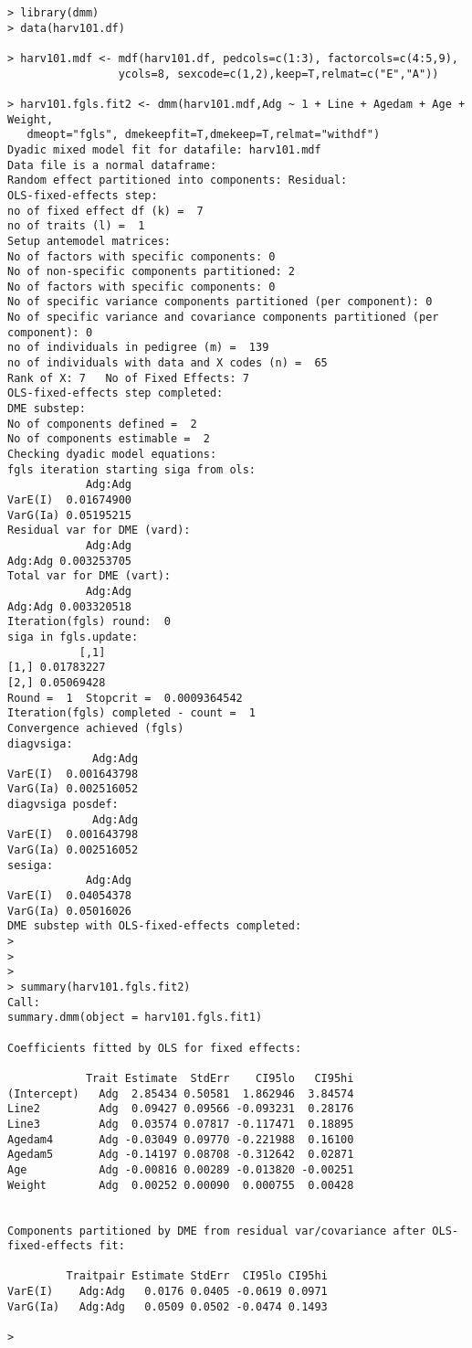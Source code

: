 \documentclass[titlepage,a4paper,12pt]{article}  %
\begin{document}
\begin{verbatim}
> library(dmm)
> data(harv101.df)

> harv101.mdf <- mdf(harv101.df, pedcols=c(1:3), factorcols=c(4:5,9),
                 ycols=8, sexcode=c(1,2),keep=T,relmat=c("E","A"))

> harv101.fgls.fit2 <- dmm(harv101.mdf,Adg ~ 1 + Line + Agedam + Age + Weight, 
   dmeopt="fgls", dmekeepfit=T,dmekeep=T,relmat="withdf")
Dyadic mixed model fit for datafile: harv101.mdf
Data file is a normal dataframe:
Random effect partitioned into components: Residual:
OLS-fixed-effects step:
no of fixed effect df (k) =  7
no of traits (l) =  1
Setup antemodel matrices:
No of factors with specific components: 0
No of non-specific components partitioned: 2
No of factors with specific components: 0
No of specific variance components partitioned (per component): 0
No of specific variance and covariance components partitioned (per component): 0
no of individuals in pedigree (m) =  139
no of individuals with data and X codes (n) =  65
Rank of X: 7   No of Fixed Effects: 7
OLS-fixed-effects step completed:
DME substep:
No of components defined =  2
No of components estimable =  2
Checking dyadic model equations:
fgls iteration starting siga from ols:
            Adg:Adg
VarE(I)  0.01674900
VarG(Ia) 0.05195215
Residual var for DME (vard):
            Adg:Adg
Adg:Adg 0.003253705
Total var for DME (vart):
            Adg:Adg
Adg:Adg 0.003320518
Iteration(fgls) round:  0
siga in fgls.update:
           [,1]
[1,] 0.01783227
[2,] 0.05069428
Round =  1  Stopcrit =  0.0009364542
Iteration(fgls) completed - count =  1
Convergence achieved (fgls)
diagvsiga:
             Adg:Adg
VarE(I)  0.001643798
VarG(Ia) 0.002516052
diagvsiga posdef:
             Adg:Adg
VarE(I)  0.001643798
VarG(Ia) 0.002516052
sesiga:
            Adg:Adg
VarE(I)  0.04054378
VarG(Ia) 0.05016026
DME substep with OLS-fixed-effects completed:
>
>
>
> summary(harv101.fgls.fit2)
Call:
summary.dmm(object = harv101.fgls.fit1)

Coefficients fitted by OLS for fixed effects:

            Trait Estimate  StdErr    CI95lo   CI95hi
(Intercept)   Adg  2.85434 0.50581  1.862946  3.84574
Line2         Adg  0.09427 0.09566 -0.093231  0.28176
Line3         Adg  0.03574 0.07817 -0.117471  0.18895
Agedam4       Adg -0.03049 0.09770 -0.221988  0.16100
Agedam5       Adg -0.14197 0.08708 -0.312642  0.02871
Age           Adg -0.00816 0.00289 -0.013820 -0.00251
Weight        Adg  0.00252 0.00090  0.000755  0.00428


Components partitioned by DME from residual var/covariance after OLS-fixed-effects fit:

         Traitpair Estimate StdErr  CI95lo CI95hi
VarE(I)    Adg:Adg   0.0176 0.0405 -0.0619 0.0971
VarG(Ia)   Adg:Adg   0.0509 0.0502 -0.0474 0.1493

>
\end{verbatim}
\end{document}

